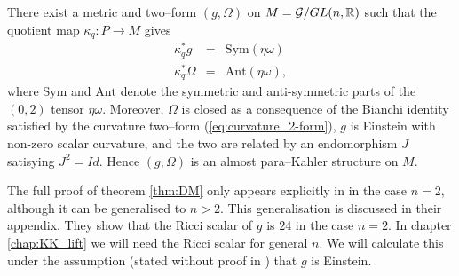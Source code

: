 \begin{theo}{\cite{DM}}\label{thm:DM}
There exist a metric and two--form
$(g,\Omega)$ on $\mbox{\ensuremath{M=\mathcal{G}/GL(n,\mathbb{R})}}$ such
that the quotient map $\kappa_q:P\rightarrow M$ gives
\begin{eqnarray} 
\kappa_q^{*}g & = & \mathrm{Sym}(\eta\omega) \label{eq:g_cartan} \\
\kappa_q^{*}\Omega & = & \mathrm{Ant}(\eta\omega), \label{eq:Omega_cartan}
\end{eqnarray}
where $\mathrm{Sym}$ and $\mathrm{Ant}$ denote the symmetric and
anti-symmetric parts of the $(0,2)$ tensor $\eta\omega$. Moreover,
$\Omega$ is closed as a consequence of the Bianchi identity satisfied by the curvature two--form (\ref{eq:curvature_2-form}), $g$
is Einstein with non-zero scalar curvature, and the two are related
by an endomorphism $J$ satisying $J^{2}=Id$. Hence $(g,\Omega)$
is an almost para--Kahler structure on $M$.
\end{theo}


\begin{rmk}
The full proof of theorem \ref{thm:DM} only appears explicitly in \cite{DM} in the case $n=2$, although it can be generalised to $n>2$. This generalisation is discussed in their appendix. They show that the Ricci scalar of $g$ is $24$ in the case $n=2$. In chapter \ref{chap:KK_lift} we will need the Ricci scalar for general $n$. We will calculate this under the assumption (stated without proof in \cite{DM}) that $g$ is Einstein.
\end{rmk}

